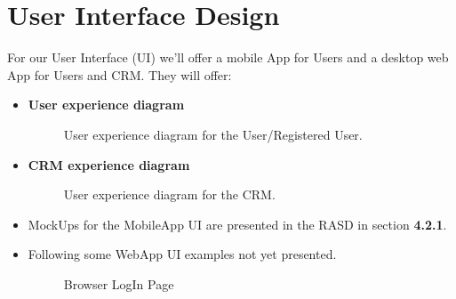 \documentclass[a4paper]{article}
\begin{document}
\newpage
\section{User Interface Design}
For our User Interface (UI) we'll offer a mobile App for Users and a desktop web App for Users and CRM. They will offer:

\begin {itemize}
\item \textbf{User experience diagram}
\begin{figure}[h]
\centering
\vspace*{\fill}
\noindent{}%
\caption {User experience diagram for the User/Registered User.}
\vspace*{0.2cm}
\end{figure}
\newpage
\item \textbf{CRM experience diagram}
\begin{figure}[h]
\centering
\vspace*{\fill}
\noindent{}%
\caption {User experience diagram for the CRM.}
\vspace*{0.2cm}
\end{figure}
\pagebreak
\item MockUps for the MobileApp UI are presented in the RASD in section \textbf{4.2.1}. 
\item Following some WebApp UI examples not yet presented.
\begin{figure}[h]
\centering
\vspace*{\fill}
\noindent{}%
\caption {Browser LogIn Page}
\vspace*{0.2cm}
\end{figure}
\begin{figure}[h]
\centering
\vspace*{\fill}

\end{figure}
\end{itemize}
\end{document}
